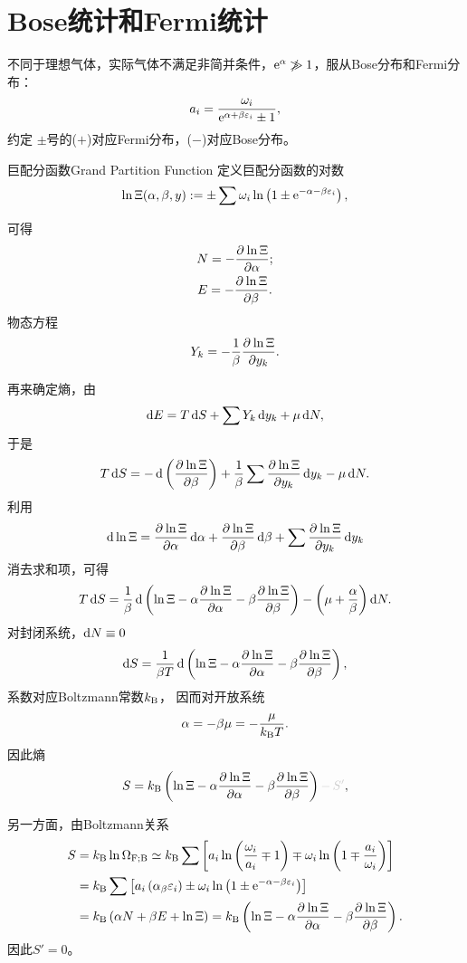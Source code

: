 \newcommand*{\tv}{\mathrm t}  %
\newcommand*{\lt}{\mathrm l}  %
\newcommand*{\Db}{\mathrm D}
\newcommand*{\Fm}{\mathrm F}

\chapter{Bose统计和Fermi统计}

不同于理想气体，实际气体不满足非简并条件，$\e\alpha\not\gg 1$，服从Bose分布和Fermi分布：
\begin{equation}
	a_i=\frac{\omega_i}{\e{\alpha+\beta\varepsilon_i}\pm 1},
\end{equation}
约定
$\pm$号的($+$)对应Fermi分布，($-$)对应Bose分布。
\begin{definition}{巨配分函数}{Grand Partition Function}
	定义巨配分函数的对数
	\begin{align}
		\ln\Xi(\alpha,\beta,y):=\pm\sum\omega_i\ln\kh{1\pm\e{-\alpha-\beta\varepsilon_i}},
	\end{align}
\end{definition}
可得
\begin{gather}
	N=-\pv{\ln\Xi}{\alpha};\\ %
	E=-\pv{\ln\Xi}{\beta}.
\end{gather}
物态方程
\begin{align}
	Y_k=-\frac1\beta\pv{\ln\Xi}{y_k}.
\end{align}

再来确定熵，由
\[
	\d E=T\d S+\sum Y_k\d y_k+\mu\d N,
\]
于是
\[
	T\d S=-\d\kh{\pv{\ln\Xi}\beta}+\frac1\beta\sum\pv{\ln\Xi}{y_k}\d y_k-\mu\d N.
\]
利用
\[
	\d\ln\Xi=\pv{\ln\Xi}\alpha\d\alpha+\pv{\ln\Xi}\beta\d\beta+\sum\pv{\ln\Xi}{y_k}\d y_k
\]
消去求和项，可得
\[
	T\d S=\frac1\beta\d\kh{\ln\Xi-\alpha\pv{\ln\Xi}\alpha-\beta\pv{\ln\Xi}\beta}-\kh{\mu+\frac\alpha\beta}\d N.
\]
对封闭系统，$\d N\equiv 0$
\[
	\d S=\frac1{\beta T}\d\kh{\ln\Xi-\alpha\pv{\ln\Xi}\alpha-\beta\pv{\ln\Xi}\beta},
\]
系数对应Boltzmann常数$\kB$，
因而对开放系统
\begin{align}\label{Bose-mu}
	\alpha=-\beta\mu=-\frac\mu{\kB T}.
\end{align}
因此熵
\begin{align}
	S=\kB\kh{\ln\Xi-\alpha\pv{\ln\Xi}\alpha-\beta\pv{\ln\Xi}\beta}{\color[gray]{.8}-\,S'},
\end{align}

另一方面，由Boltzmann关系
\begin{align*}
	S & =\kB\ln\Om[F;B]\simeq\kB\sum\fkh{a_i\ln\kh{\frac{\omega_i}{a_i}\mp 1}\mp\omega_i\ln\kh{1\mp\frac{a_i}{\omega_i}}} \\
	  & =\kB\sum\fkh{a_i\kh{\alpha_\beta\varepsilon_i}\pm\omega_i\ln\kh{1\pm\e{-\alpha-\beta\varepsilon_i}}}                             \\
	  & =\kB\kh{\alpha N+\beta E+\ln\Xi}=\kB\kh{\ln\Xi-\alpha\pv{\ln\Xi}\alpha-\beta\pv{\ln\Xi}\beta}.
\end{align*}
因此$S'=0$。
